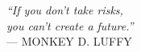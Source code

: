 {\sffamily\itshape
``If you don't take risks,\\
you can't create a future.''\\}
--- \textsc{MONKEY D. LUFFY}
